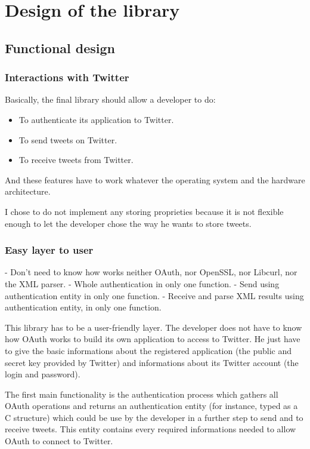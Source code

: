 \chapter{Design of the library}


\section{Functional design}

\subsection{Interactions with Twitter}

\hspace{15mm}Basically, the final library should allow a developer to do:
\begin{itemize}
\item To authenticate its application to Twitter. 
\item To send tweets on Twitter.
\item To receive tweets from Twitter.
\end{itemize}

And these features have to work whatever the operating system and the hardware architecture.

I chose to do not implement any storing proprieties because it is not flexible enough to let the developer chose the way he wants to store tweets.


\subsection{Easy layer to user}

- Don't need to know how works neither OAuth, nor OpenSSL, nor Libcurl, nor the XML parser.
- Whole authentication in only one function.
- Send using authentication entity in only one function.
- Receive and parse XML results using authentication entity, in only one function.

This library has to be a user-friendly layer. The developer does not have to know how OAuth works to build its own application to access to Twitter. He just have to give the basic informations about the registered application (the public and secret key provided by Twitter) and informations about its Twitter account (the login and password).

The first main functionality is the authentication process which gathers all OAuth operations and returns an authentication entity (for instance, typed as a C structure) which could be use by the developer in a further step to send and to receive tweets. This entity contains every required informations needed to allow OAuth to connect to Twitter. 

